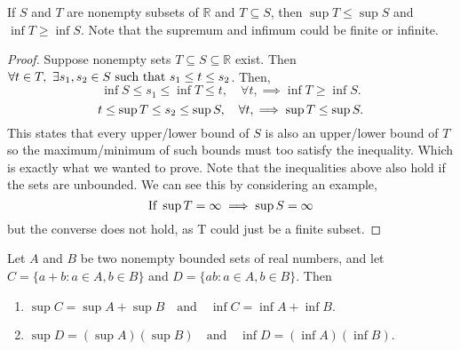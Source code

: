 \documentclass[../main.tex]{subfiles}
\begin{document}
\begin{exercise}\label{ex:sup_inf_subsets}
If \( S \) and \( T \) are nonempty subsets of \( \mathbb{R} \) and \( T \subseteq S \), then \( \sup T \leq \sup S \) and \( \inf T \geq \inf S \). Note that the supremum and infimum could be finite or infinite.
\end{exercise}




\begin{proof}
Suppose nonempty sets \( T \subseteq S \subseteq \mathbb{R}\) exist. Then \(\forall t \in T, \ \exists s_1, s_2 \in S \textnormal{ such that } s_1 \leq t \leq s_2\). Then, 
\[
\inf S \leq s_1 \leq \inf T \leq t, \quad \forall t, \implies \inf T \geq \inf S.\]\[
t \leq \sup T \leq s_2 \leq \sup S, \quad \forall t, \implies \sup T \leq \sup S.\\
\]
This states that every upper/lower bound of \(S\) is also an upper/lower bound of \(T\) so the maximum/minimum of such bounds must too satisfy the inequality. Which is exactly what we wanted to prove. Note that the inequalities above also hold if the sets are unbounded. We can see this by considering an example, 
\[
\textnormal{If } \sup T = \infty \implies \sup S = \infty \]but the converse does not hold, as T could just be a finite subset.
 

\end{proof}









\begin{exercise} \label{ex:sup_inf_algebra}
Let \( A \) and \( B \) be two nonempty bounded sets of real numbers, and let \( C = \{a + b : a \in A, b \in B\} \) and \( D = \{ab : a \in A, b \in B\} \). Then 
\begin{enumerate}
    \item \(\sup C = \sup A + \sup B \quad \text{and} \quad \inf C = \inf A + \inf B.\)
    \item \(\sup D = (\sup A)(\sup B) \quad \text{and} \quad \inf D = (\inf A)(\inf B). \)
\end{enumerate}

\end{exercise}
\end{document}
